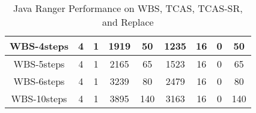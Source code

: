 \begin{table*}[]
\begin{tabular}{@{}ccccccccc@{}}
        WBS-4steps                                                  & 4                                                            & 1                                                          & 1919                                                        & 50                                                             & 1235                                                           & 16                                                         & 0                                                             & 50       \\ \midrule
        WBS-5steps                                                  & 4                                                            & 1                                                          & 2165                                                        & 65                                                             & 1523                                                           & 16                                                         & 0                                                             & 65       \\ \midrule
        WBS-6steps                                                  & 4                                                            & 1                                                          & 3239                                                        & 80                                                             & 2479                                                           & 16                                                         & 0                                                             & 80       \\ \midrule
        WBS-10steps                                                 & 4                                                            & 1                                                          & 3895                                                        & 140                                                            & 3163                                                           & 16                                                         & 0                                                             & 140      \\ \bottomrule
    \end{tabular}
    \caption{Java Ranger Performance on WBS, TCAS, TCAS-SR, and Replace}
    \label{table:results}
\end{table*}
